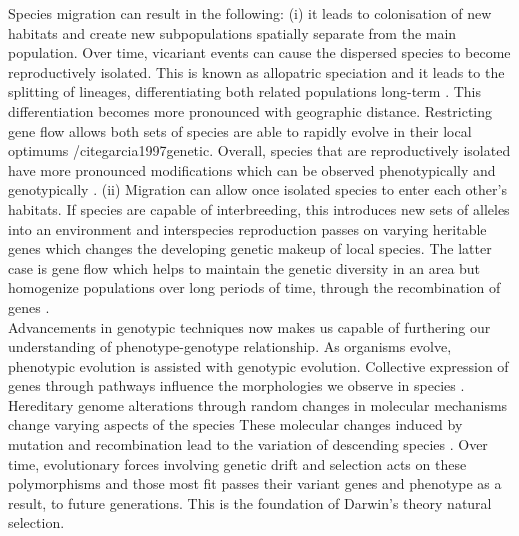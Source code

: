 Species migration can result in the following: (i) it leads to colonisation of new habitats and create new subpopulations spatially separate from the main population. Over time, vicariant events can cause the dispersed species to become reproductively isolated. This is known as allopatric speciation and it leads to the splitting of lineages, differentiating both related populations long-term \cite{barber1999patterns,coyne1992genetics}. This differentiation becomes more pronounced with geographic distance. Restricting gene flow allows both sets of species are able to rapidly evolve in their local optimums /cite{garcia1997genetic}. Overall, species that are reproductively isolated have more pronounced modifications which can be observed phenotypically and genotypically \cite{pongratz2002genetic,sato2006effect}. (ii) Migration can allow once isolated species to enter each other’s habitats. If species are capable of interbreeding, this introduces new sets of alleles into an environment and interspecies reproduction passes on varying heritable genes which changes the developing genetic makeup of local species. The latter case is gene flow which helps to maintain the genetic diversity in an area but homogenize populations over long periods of time, through the recombination of genes \cite{sato2006effect,garcia1997genetic}.\\
Advancements in genotypic techniques now makes us capable of furthering our understanding of phenotype-genotype relationship. As organisms evolve, phenotypic evolution is assisted with genotypic evolution. Collective expression of genes through pathways influence the morphologies we observe in species \cite{hinman2009evolution}. Hereditary genome alterations through random changes in molecular mechanisms change varying aspects of the species \cite{chandrasekaran2008origins} These molecular changes induced by mutation and recombination lead to the variation of descending species \cite{chandrasekaran2008origins,ohno1999gene,brown2002genomes}. Over time, evolutionary forces involving genetic drift and selection acts on these polymorphisms and those most fit passes their variant genes and phenotype as a result, to future generations. This is the foundation of Darwin’s theory natural selection.\\
